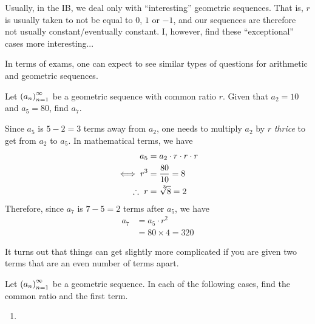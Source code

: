 \begin{remark}
    Usually, in the IB, we deal only with ``interesting'' geometric sequences. That is, $r$ is usually taken to not be equal to $0$, $1$ or $-1$, and our sequences are therefore not usually constant/eventually constant. I, however, find these ``exceptional'' cases more interesting...
\end{remark}

In terms of exams, one can expect to see similar types of questions for arithmetic and geometric sequences.
\begin{boxexample}
    Let $\left( a_n \right)_{n=1}^{\infty}$ be a geometric sequence with common ratio $r$. Given that $a_2 = 10$ and $a_5 = 80$, find $a_7$.
    \begin{solution}
        Since $a_5$ is $5 - 2 = 3$ terms away from $a_2$, one needs to multiply $a_2$ by $r$ \textit{thrice} to get from $a_2$ to $a_5$. In mathematical terms, we have
        \begin{align*}
            a_5 &= a_2 \cdot r \cdot r \cdot r \\
            \iff r^3 &= \frac{80}{10} = 8 \\
            \ergo \ r &= \cbrt{8} = 2
        \end{align*}
        Therefore, since $a_7$ is $7 - 5 = 2$ terms after $a_5$, we have
        \begin{align*}
            a_7 &= a_5 \cdot r^2 \\
            &= 80 \times 4 = 320
        \end{align*}
        \vspace{-2em}
    \end{solution}
\end{boxexample}

It turns out that things can get slightly more complicated if you are given two terms that are an even number of terms apart.

\begin{boxexercise}
    Let $\left( a_n \right)_{n=1}^{\infty}$ be a geometric sequence. In each of the following cases, find the common ratio and the first term.
    \begin{enumerate}
        \item 
    \end{enumerate}
\end{boxexercise}
